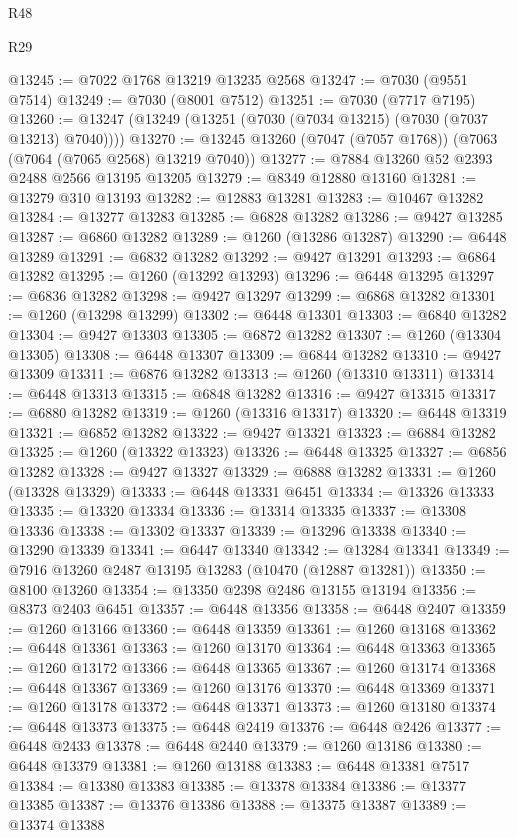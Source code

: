 \begin{lexlean}{R48}
\begin{lexlean}{R29}
\begin{coremodule}
{{{{{{{{{{{{{{{{{{{{{{{{{{{{{{{{{{{{{{{{{{{{{{{{{{{{{{{{{{{{{{{{{{{{{{{{{{{{{{{{{{{{{{{{{{{{{{{{{{{{{{{{{{{{{{{{{{{{{{{{{{{{{{{{{{{{{{{{{{{{{{{{{{{{{{{{{{{{{{{{{{{{{{{{{{{{{{{{{{{{{{{{{{{{{{{{{{{{{{{{{{{{{{{{{{{{{{{{{{@13245 := @7022 @1768 @13219 @13235 @2568
@13247 := @7030 (@9551 @7514)
@13249 := @7030 (@8001 @7512)
@13251 := @7030 (@7717 @7195)
@13260 := @13247 (@13249 (@13251 (@7030 (@7034 @13215) (@7030 (@7037 @13213) @7040))))
@13270 := @13245 @13260 (@7047 (@7057 @1768)) (@7063 (@7064 (@7065 @2568) @13219 @7040))
@13277 := @7884 @13260 @52 @2393 @2488 @2566 @13195 @13205
@13279 := @8349 @12880 @13160
@13281 := @13279 @310 @13193
@13282 := @12883 @13281
@13283 := @10467 @13282
@13284 := @13277 @13283
@13285 := @6828 @13282
@13286 := @9427 @13285
@13287 := @6860 @13282
@13289 := @1260 (@13286 @13287)
@13290 := @6448 @13289
@13291 := @6832 @13282
@13292 := @9427 @13291
@13293 := @6864 @13282
@13295 := @1260 (@13292 @13293)
@13296 := @6448 @13295
@13297 := @6836 @13282
@13298 := @9427 @13297
@13299 := @6868 @13282
@13301 := @1260 (@13298 @13299)
@13302 := @6448 @13301
@13303 := @6840 @13282
@13304 := @9427 @13303
@13305 := @6872 @13282
@13307 := @1260 (@13304 @13305)
@13308 := @6448 @13307
@13309 := @6844 @13282
@13310 := @9427 @13309
@13311 := @6876 @13282
@13313 := @1260 (@13310 @13311)
@13314 := @6448 @13313
@13315 := @6848 @13282
@13316 := @9427 @13315
@13317 := @6880 @13282
@13319 := @1260 (@13316 @13317)
@13320 := @6448 @13319
@13321 := @6852 @13282
@13322 := @9427 @13321
@13323 := @6884 @13282
@13325 := @1260 (@13322 @13323)
@13326 := @6448 @13325
@13327 := @6856 @13282
@13328 := @9427 @13327
@13329 := @6888 @13282
@13331 := @1260 (@13328 @13329)
@13333 := @6448 @13331 @6451
@13334 := @13326 @13333
@13335 := @13320 @13334
@13336 := @13314 @13335
@13337 := @13308 @13336
@13338 := @13302 @13337
@13339 := @13296 @13338
@13340 := @13290 @13339
@13341 := @6447 @13340
@13342 := @13284 @13341
@13349 := @7916 @13260 @2487 @13195 @13283 (@10470 (@12887 @13281))
@13350 := @8100 @13260
@13354 := @13350 @2398 @2486 @13155 @13194
@13356 := @8373 @2403 @6451
@13357 := @6448 @13356
@13358 := @6448 @2407
@13359 := @1260 @13166
@13360 := @6448 @13359
@13361 := @1260 @13168
@13362 := @6448 @13361
@13363 := @1260 @13170
@13364 := @6448 @13363
@13365 := @1260 @13172
@13366 := @6448 @13365
@13367 := @1260 @13174
@13368 := @6448 @13367
@13369 := @1260 @13176
@13370 := @6448 @13369
@13371 := @1260 @13178
@13372 := @6448 @13371
@13373 := @1260 @13180
@13374 := @6448 @13373
@13375 := @6448 @2419
@13376 := @6448 @2426
@13377 := @6448 @2433
@13378 := @6448 @2440
@13379 := @1260 @13186
@13380 := @6448 @13379
@13381 := @1260 @13188
@13383 := @6448 @13381 @7517
@13384 := @13380 @13383
@13385 := @13378 @13384
@13386 := @13377 @13385
@13387 := @13376 @13386
@13388 := @13375 @13387
@13389 := @13374 @13388
}}}}}}}}}}}}}}}}}}}}}}}}}}}}}}}}}}}}}}}}}}}}}}}}}}}}}}}}}}}}}}}}}}}}}}}}}}}}}}}}}}}}}}}}}}}}}}}}}}}}}}}}}}}}}}}}}}}}}}}}}}}}}}}}}}}}}}}}}}}}}}}}}}}}}}}}}}}}}}}}}}}}}}}}}}}}}}}}}}}}}}}}}}}}}}}}}}}}}}}}}}}}}}}}}}}}}}}}}}
\end{coremodule}
\end{lexlean}
\end{lexlean}
